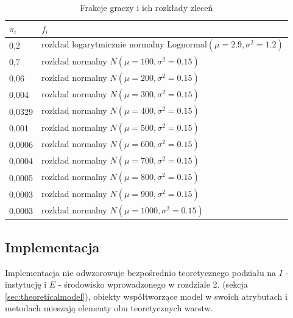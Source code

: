 \begin{table}
\caption{Frakcje graczy i ich rozkłady zleceń} 
\label{tab:distmix}
\begin{center}
\begin{tabular}{ |p{2cm}|p{10cm}|}
\hline
\textbf{$\pi_i$} & \textbf{$f_i$} \\
\hline 0,2 & rozkład logarytmicznie normalny $\mathrm{Lognormal}(\mu=2.9, \sigma^2=1.2)$\\
\hline
 0,7 & rozkład normalny $N(\mu=100, \sigma^2=0.15)$\\
 \hline
 0,06& rozkład normalny $N(\mu=200, \sigma^2=0.15)$\\
 \hline
0,004& rozkład normalny $N(\mu=300, \sigma^2=0.15)$\\
\hline
0,0329 & rozkład normalny $N(\mu=400, \sigma^2=0.15)$\\
\hline
0,001 & rozkład normalny $N(\mu=500, \sigma^2=0.15)$\\
\hline
0,0006 &rozkład normalny $N(\mu=600, \sigma^2=0.15)$\\
\hline
0,0004 &rozkład normalny $N(\mu=700, \sigma^2=0.15)$\\
\hline
0,0005 &rozkład normalny $N(\mu=800, \sigma^2=0.15)$\\
\hline
0,0003 &rozkład normalny $N(\mu=900, \sigma^2=0.15)$\\
\hline
0,0003 & rozkład normalny $N(\mu=1000, \sigma^2=0.15)$\\
\hline
\end{tabular} 
\end{center}
\end{table}
\subsection{Implementacja}
Implementacja nie odwzorowuje bezpośrednio teoretycznego podziału na $I$ - instytucję i $E$ - środowisko wprowadzonego w rozdziale 2. (sekcja \ref{sec:theoreticalmodel}), obiekty współtworzące model w swoich atrybutach i metodach mieszają elementy obu teoretycznych warstw. 


